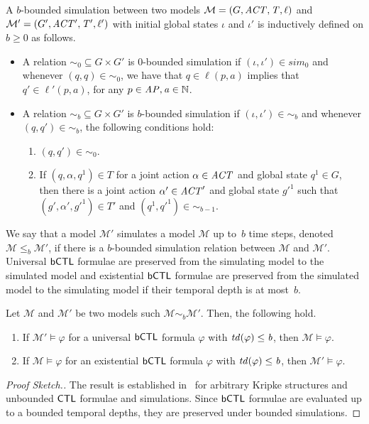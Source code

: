 \begin{definition}
A $b$-bounded simulation between two models $\mathcal M = \left ( G, \it{ACT}, T,
\ell \right )$ and $\mathcal{M'} = \left ( G', \it{ACT'}, T', \ell' \right )$  with initial
global states $\iota$ and $\iota'$ is inductively defined on $b \geq 0$ as
follows.
\begin{itemize}
    \item A relation $\sim_0 \subseteq G \times G'$ is  $0$-bounded simulation
    if $(\iota, \iota') \in sim_0$ and whenever $(q, q) \in \sim_0$, we have
    that $q \in \ell(p,a)$ implies that $q' \in \ell'(p, a)$, for any $p \in
    \it{AP}, a \in \mathbb N$.
    \item A relation $\sim_b \subseteq G \times G'$ is  $b$-bounded simulation
    if $(\iota, \iota') \in \sim_b$ and  whenever $(q, q') \in \sim_b$, the
    following conditions hold:
    \begin{enumerate}
    \item $(q, q') \in \sim_0$.
    \item If $(q, \alpha, q^1) \in T$ for a joint action $\alpha \in \it{ACT}$ and
    global state $q^1 \in G$, then there is a joint action
    $\alpha' \in \it{ACT}'$ and global state $g'^1$ such that
    $(g', \alpha', g'^1) \in T'$ and 
    $(q^1, q'^1) \in \sim_{b - 1}$.  
\end{enumerate}
\end{itemize}
\end{definition}

We say that a model $\mathcal{M'}$ simulates a model $\mathcal M$ up to~$b$ time
steps, denoted $\mathcal M \leq_b \mathcal{M'}$, if there is a $b$-bounded
simulation relation between $\mathcal M$ and $\mathcal{M'}$.  Universal $\sf{bCTL}$
formulae are preserved from the simulating model to the simulated model and
existential $\sf{bCTL}$ formulae are preserved from the simulated model to the
simulating model if their temporal depth is at most~$b$. 

\begin{theorem} Let $\mathcal M$ and $\mathcal M'$ be two models such $\mathcal
M \sim_b  \mathcal M'$. Then, the following hold.
\label{th:sim}
\begin{enumerate}
    \item If $\mathcal M' \models \varphi$ for a universal $\sf{bCTL}$ formula
    $\varphi$ with $\it{td}(\varphi) \leq b$, then $\mathcal M \models
    \varphi$.
    \item If $\mathcal M \models \varphi$ for an existential $\sf{bCTL}$ formula
    $\varphi$ with $\it{td}(\varphi) \leq b$, then $\mathcal M' \models
    \varphi$.
\end{enumerate}
\end{theorem}
\begin{proof}[Proof Sketch.]
The result is established in~\cite{ClarkeGrumbergLong94} for arbitrary Kripke
structures and unbounded $\sf{CTL}$ formulae and simulations. Since $\sf{bCTL}$ formulae
are evaluated up to a bounded temporal depths, they are preserved under bounded
simulations.
\end{proof}

